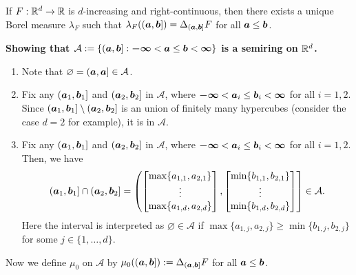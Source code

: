 \begin{enumerate}
\begin{theorem}
\label{thm:construct-borel-meas-rd}
If \(F:\mathbb{R}^d\to\mathbb{R}\) is \(d\)-increasing and right-continuous, then there exists
a unique Borel measure \(\lambda_{F}\) such that
\(\lambda_{F}((\bm{a},\bm{b}])=\Delta_{(\bm{a},\bm{b}]}F\) for all
\(\bm{a}\le\bm{b}\).
\end{theorem}
\begin{pf}
\textbf{Showing that \(\mathcal{A}:=\{(\bm{a},\bm{b}]:
\bm{-\infty}<\bm{a}\le\bm{b}<\bm{\infty}\}\) is a semiring on \(\mathbb{R}^d\).}
\begin{enumerate}[label={(\arabic*)}]
\item Note that \(\varnothing=(\bm{a},\bm{a}]\in\mathcal{A}\).
\item Fix any \((\bm{a}_1,\bm{b}_1]\) and \((\bm{a}_2,\bm{b}_2]\) in
\(\mathcal{A}\), where \(\bm{-\infty}<\bm{a}_i\le\bm{b}_i<\bm{\infty}\)
for all \(i=1,2\). Since \((\bm{a}_1,\bm{b}_1]\setminus
(\bm{a}_2,\bm{b}_2]\) is an union of finitely many hypercubes (consider the
case \(d=2\) for example), it is in \(\mathcal{A}\).
\item Fix any \((\bm{a}_1,\bm{b}_1]\) and \((\bm{a}_2,\bm{b}_2]\) in
\(\mathcal{A}\), where \(\bm{-\infty}<\bm{a}_i\le\bm{b}_i<\bm{\infty}\)
for all \(i=1,2\). Then, we have
\[
(\bm{a}_1,\bm{b}_1]\cap(\bm{a}_2,\bm{b}_2]
=\left(\begin{bmatrix}\max\{a_{1,1},a_{2,1}\} \\
\vdots \\
\max\{a_{1,d},a_{2,d}\}
\end{bmatrix},
\begin{bmatrix}\min\{b_{1,1},b_{2,1}\} \\
\vdots \\
\min\{b_{1,d},b_{2,d}\}
\end{bmatrix}
\right]
\in\mathcal{A}.
\]
Here the interval is interpreted as \(\varnothing\in\mathcal{A}\) if
\(\max\{a_{1,j},a_{2,j}\}\ge \min\{b_{1,j},b_{2,j}\}\) for some
\(j\in\{1,\dotsc,d\}\).
\end{enumerate}
Now we define \(\mu_0\) on \(\mathcal{A}\) by
\(\mu_0((\bm{a},\bm{b}]):=\Delta_{(\bm{a},\bm{b}]}F\) for all
\(\bm{a}\le\bm{b}\).


\end{pf}
\end{enumerate}

